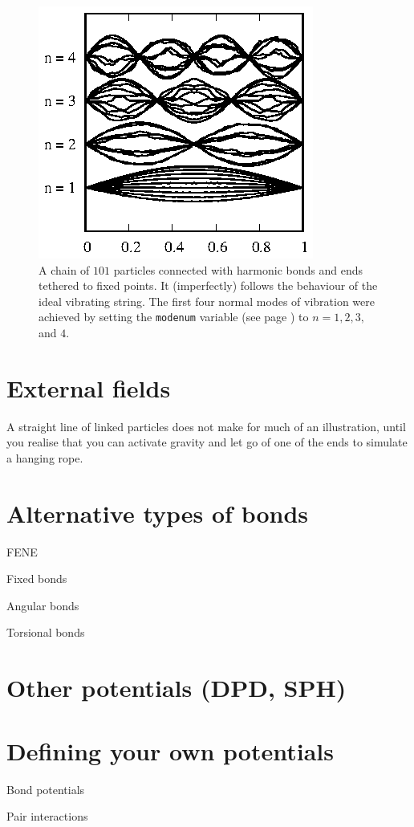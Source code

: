 \begin{figure}
  \centering
  \includegraphics[width = 0.6 \textwidth]{figures/vibratingString.eps}
  \caption{\label{vibratingSting}A chain of $101$ particles connected with
           harmonic bonds and ends tethered to fixed points. It (imperfectly)
           follows the behaviour of the ideal vibrating string. The first four
           normal modes of vibration were achieved by setting the
           \texttt{modenum} variable (see page
           \pageref{stringInitialConditions}) to $n = 1, 2, 3,$ and $4$.}
\end{figure}

\section{External fields}

A straight line of linked particles does not make for much of an illustration,
until you realise that you can activate gravity and let go of one of the ends to
simulate a hanging rope.



\section{Alternative types of bonds}

FENE

Fixed bonds

Angular bonds

Torsional bonds

\section{Other potentials (DPD, SPH)}

\section{Defining your own potentials}

Bond potentials

Pair interactions
